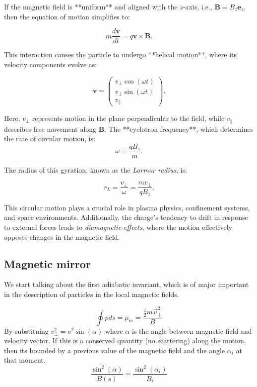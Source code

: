 \documentclass[smallextended]{svjour3}
\begin{document}
If the magnetic field is **uniform** and aligned with the \( z \)-axis, i.e., \( \mathbf{B} = B_z \mathbf{e}_z \), then the equation of motion simplifies to:

\begin{equation}
    m \frac{d\mathbf{v}}{dt} = q \mathbf{v} \times \mathbf{B}.
\end{equation}

This interaction causes the particle to undergo **helical motion**, where its velocity components evolve as:

\[
\mathbf{v} =
\begin{pmatrix}
v_{\perp} \cos(\omega t) \\
v_{\perp} \sin(\omega t) \\
v_{\parallel}
\end{pmatrix}.
\]

Here, \( v_{\perp} \) represents motion in the plane perpendicular to the field, while \( v_{\parallel} \) describes free movement along \( \mathbf{B} \). The **cyclotron frequency**, which determines the rate of circular motion, is:
\begin{equation}
    \omega = \frac{q B_z}{m}.
\end{equation}

The radius of this gyration, known as the \textit{Larmor radius}, is:

\begin{equation}
    r_L = \frac{v_\perp}{\omega} = \frac{m v_{\perp}}{q B_z}.
\end{equation}

This circular motion plays a crucial role in plasma physics, confinement systems, and space environments. Additionally, the charge’s tendency to drift in response to external forces leads to \textit{diamagnetic effects}, where the motion effectively opposes changes in the magnetic field. 

\subsection{Magnetic mirror}

We start talking about the first adiabatic invariant, which is of major important in the description of particles in the local magnetic fields.

\begin{equation}
    \oint p ds = \mu_m = \frac{\frac{1}{2}m\Vec{v}_\perp ^2}{B}
    \label{AdInvariant}
\end{equation}
By substituing $v_{\perp}^2 = v^2 \sin(\alpha)$ where $\alpha$ is the angle between magnetic field and velocity vector. If this is a conserved quantity (no scattering) along the motion, then its bounded by a previous value of the magnetic field and the angle $\alpha_i$ at that moment.
\begin{equation}
\frac{\sin^2(\alpha) }{B(s)}=\frac{\sin^2(\alpha_i) }{B_i} 
\end{equation}
\end{document}
